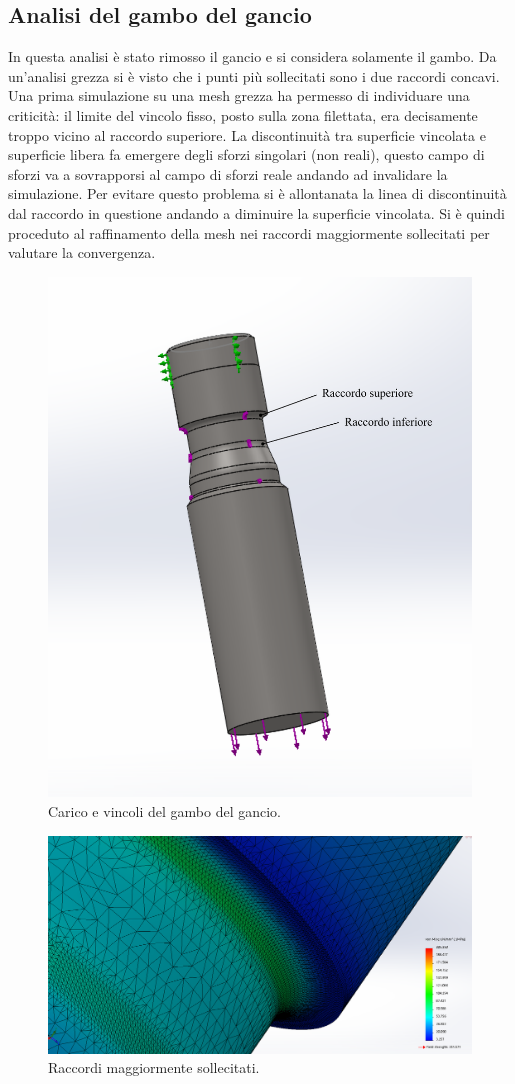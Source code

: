 \subsection{Analisi del gambo del gancio}
In questa analisi è stato rimosso il gancio e si considera solamente il gambo.
Da un'analisi grezza si è visto che i punti più sollecitati sono i due raccordi concavi.
Una prima simulazione su una mesh grezza ha permesso di individuare una criticità: il limite del vincolo fisso, posto sulla zona filettata, era decisamente troppo vicino al raccordo superiore. La discontinuità tra superficie vincolata e superficie libera fa emergere degli sforzi singolari (non reali), questo campo di sforzi va a sovrapporsi al campo di sforzi reale andando ad invalidare la simulazione. 
Per evitare questo problema si è allontanata la linea di discontinuità dal raccordo in questione andando a diminuire la superficie vincolata. 
Si è quindi proceduto al raffinamento della mesh nei raccordi maggiormente sollecitati per valutare la convergenza. 
\begin{figure}[H]
\centering
  \includegraphics[width=.4\textwidth]{imgs/fem/SimGambo2.pdf}
\caption{Carico e vincoli del gambo del gancio.}
\label{fig:SimGambo2}
\end{figure}
\begin{figure}[H]
\centering
  \includegraphics[width=.7\textwidth]{imgs/fem/SimGambo1}
\caption{Raccordi maggiormente sollecitati.}
\label{fig:SimGambo1}
\end{figure}
